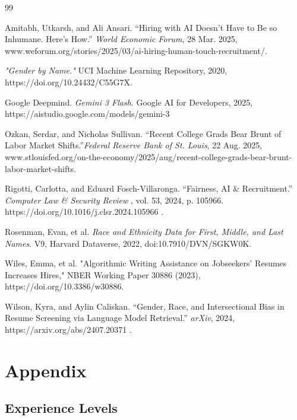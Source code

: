 \documentclass[11pt,letterpaper]{article}
\begin{document}
\begin{thebibliography}{99}



Amitabh, Utkarsh, and Ali Ansari. “Hiring with AI Doesn’t Have to Be so Inhumane. Here’s How.” \textit{World Economic Forum}, 28 Mar. 2025, www.weforum.org/stories/2025/03/ai-hiring-human-touch-recruitment/. 


\textit{"Gender by Name."} UCI Machine Learning Repository, 2020, https://doi.org/10.24432/C55G7X.

Google Deepmind. \textit{Gemini 3 Flash}. Google AI for Developers, 2025, https://aistudio.google.com/models/gemini-3

Ozkan, Serdar, and Nicholas Sullivan. “Recent College Grads Bear Brunt of Labor Market Shifts.”\textit{Federal Reserve Bank of St. Louis}, 22 Aug. 2025, www.stlouisfed.org/on-the-economy/2025/aug/recent-college-grads-bear-brunt-labor-market-shifts. 

Rigotti, Carlotta, and Eduard Fosch-Villaronga. “Fairness, AI \& Recruitment.” \textit{Computer Law \& Security Review} , vol. 53, 2024, p. 105966. https://doi.org/10.1016/j.clsr.2024.105966
.

Rosenman, Evan, et al. \textit{Race and Ethnicity Data for First, Middle, and Last Names}. V9, Harvard Dataverse, 2022, doi:10.7910/DVN/SGKW0K.

Wiles, Emma, et al. "Algorithmic Writing Assistance on Jobseekers’ Resumes Increases Hires," NBER Working Paper 30886 (2023), https://doi.org/10.3386/w30886. 

Wilson, Kyra, and Aylin Caliskan. “Gender, Race, and Intersectional Bias in Resume Screening via Language Model Retrieval.” \textit{arXiv}, 2024, https://arxiv.org/abs/2407.20371 .




\end{thebibliography}



\newpage



\section{Appendix}
 \label{app:appendix} 
\subsection{Experience Levels}
\end{document}

